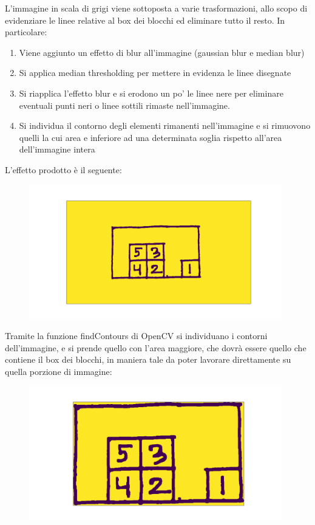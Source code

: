 \documentclass{article}
\begin{document}
	
	\noindent L'immagine in scala di grigi viene sottoposta a varie trasformazioni, allo scopo di evidenziare le linee relative al box dei blocchi ed eliminare tutto il resto. In particolare:
	\begin{enumerate}
		\item Viene aggiunto un effetto di blur all'immagine (gaussian blur e median blur)
		\item Si applica median thresholding per mettere in evidenza le linee disegnate
		\item Si riapplica l'effetto blur e si erodono un po' le linee nere per eliminare eventuali punti neri o linee sottili rimaste nell'immagine.
		\item Si individua il contorno degli elementi rimanenti nell'immagine e si rimuovono quelli la cui area e inferiore ad una determinata soglia rispetto all'area dell'immagine intera
	\end{enumerate}
	L'effetto prodotto è il seguente:
	
	\begin{figure}[H]
		\centering
		\includegraphics[width=11cm]{./images/immagine_test_filtered.png}
	\end{figure}
	
	\noindent Tramite la funzione findContours di OpenCV si individuano i contorni dell'immagine, e si prende quello con l'area maggiore, che dovrà essere quello che contiene il box dei blocchi, in maniera tale da poter lavorare direttamente su quella porzione di immagine:
	
	\begin{figure}[H]
		\centering
		\includegraphics[width=11cm]{./images/immagine_test_box.png}
	\end{figure}
	
\end{document}
